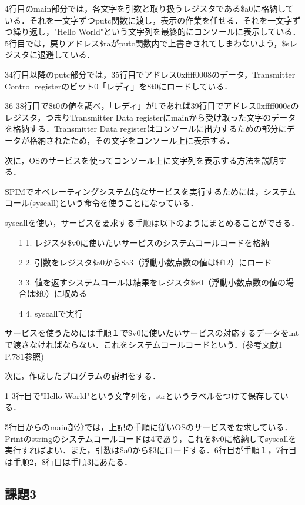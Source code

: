 \documentclass[a4j]{jarticle}
\begin{document}
4行目のmain部分では，各文字を引数と取り扱うレジスタである\$a0に格納している．それを一文字ずつputc関数に渡し，表示の作業を任せる．それを一文字ずつ繰り返し，"Hello World"という文字列を最終的にコンソールに表示している．5行目では，戻りアドレス\$raがputc関数内で上書きされてしまわないよう，\$sレジスタに退避している．

34行目以降のputc部分では，35行目でアドレス0xffff0008のデータ，Transmitter Control registerのビット0「レディ」を\$t0にロードしている．

36-38行目で\$t0の値を調べ，「レディ」が1であれば39行目でアドレス0xffff000cのレジスタ，つまりTransmitter Data registerにmainから受け取った文字のデータを格納する．Transmitter Data registerはコンソールに出力するための部分にデータが格納されたため，その文字をコンソール上に表示する．

次に，OSのサービスを使ってコンソール上に文字列を表示する方法を説明する．

SPIMでオペレーティングシステム的なサービスを実行するためには，システムコール(syscall)という命令を使うことになっている．

syscallを使い，サービスを要求する手順は以下のようにまとめることができる．

\begin{itemize}
\item[1]1. レジスタ\$v0に使いたいサービスのシステムコールコードを格納
\item[2]2. 引数をレジスタ\$a0から\$a3（浮動小数点数の値は\$f12）にロード
\item[3]3. 値を返すシステムコールは結果をレジスタ\$v0（浮動小数点数の値の場合は\$f0）に収める
\item[4]4. syscallで実行
\end{itemize}


サービスを使うためには手順１で\$v0に使いたいサービスの対応するデータをintで渡さなければならない．これをシステムコールコードという．(参考文献1 P.781参照)

次に，作成したプログラムの説明をする．

1-3行目で"Hello World"という文字列を，strというラベルをつけて保存している．

5行目からのmain部分では，上記の手順に従いOSのサービスを要求している．Printのstringのシステムコールコードは4であり，これを\$v0に格納してsyscallを実行すればよい．また，引数は\$a0から\$3にロードする．6行目が手順１，7行目は手順2，8行目は手順3にあたる．


\subsection{課題3}
\end{document}
